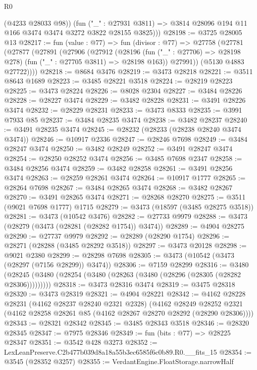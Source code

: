 \begin{lexlean}{R0}
\begin{coremodule}
          (@4233 @28033 @98))
        (fun ("_" : @27931 @3811) =>
        @3814 @28096 @194 @11 @166 @3474 @3474 @3272 @3822 @28155 @3825)))
@28198 := @3725 @28005 @13
@28217 := fun (value : @77) =>
  fun (divisor : @77) =>
  @27758
    (@27781
      (@27877
        (@27891
          (@27906
            (@27912
              (@28196 (fun ("_" : @27706) => @28198 @278) (fun ("_" : @27705 @3811) => @28198 @163))
              @27991))
          (@5130 @4883 @27722))))
@28218 := @8684 @3476
@28219 := @3473 @28218
@28221 := @3511 @8643 @1689
@28223 := @3485 @28221 @3518
@28224 := @28219 @28223
@28225 := @3473 @28224
@28226 := @8028 @2304
@28227 := @3484 @28226
@28228 := @28227 @3474
@28229 := @3482 @28228
@28231 := @3491 @28226 @3474
@28232 := @28229 @28231
@28233 := @3473 @8333
@28235 := @3991 @7933 @85
@28237 := @3484 @28235 @3474
@28238 := @3482 @28237
@28240 := @3491 @28235 @3474
@28245 := @28232 (@28233 (@28238 @28240 @3474 @3474))
@28246 := @10917 @2336
@28247 := @28246 @7698
@28249 := @3484 @28247 @3474
@28250 := @3482 @28249
@28252 := @3491 @28247 @3474
@28254 := @28250 @28252 @3474
@28256 := @3485 @7698 @2347
@28258 := @3484 @28256 @3474
@28259 := @3482 @28258
@28261 := @3491 @28256 @3474
@28263 := @28259 @28261 @3474
@28264 := @10917 @1777
@28265 := @28264 @7698
@28267 := @3484 @28265 @3474
@28268 := @3482 @28267
@28270 := @3491 @28265 @3474
@28271 := @28268 @28270
@28275 := @3511 (@9021 @7698 @1777) @1715
@28279 := @3473 (@18597 (@3485 @28275 @3518))
@28281 := @3473 (@10542 @3476)
@28282 := @27733 @9979
@28288 := @3473 (@28279 (@3473 (@28281 (@28282 @1754)) @3474))
@28289 := @4904 @28275
@28290 := @27737 @9979
@28292 := @28289 (@28290 @1754)
@28296 := @28271 (@28288 (@3485 @28292 @3518))
@28297 := @3473 @20128
@28298 := @9021 @2380
@28299 := @28298 @7698
@28305 := @3473 (@10542 (@3473 (@28297 (@7156 @28299)) @3474))
@28306 := @7159 @28299
@28316 := @3480 (@28245 (@3480 (@28254 (@3480 (@28263 (@3480 (@28296 (@28305 (@28282 @28306)))))))))
@28318 := @3473 @28316 @3474
@28319 := @3475 @28318
@28320 := @3473 @28319
@28321 := @4904 @28221
@28342 := @4162
    @28228
    @28231
    (@4162 @28237 @28240 @2321 @2328)
    (@4162
      @28249
      @28252
      @2321
      (@4162 @28258 @28261 @85 (@4162 @28267 @28270 @28292 (@28290 @28306))))
@28343 := @28321 @28342
@28345 := @3485 @28343 @3518
@28346 := @28320 @28345
@28347 := @7975 @28346
@28349 := fun (bits : @77) => @28225 @28347
@28351 := @3542 @428 @3273
@28352 := LexLeanPreserve.C2b477b039d8a18a55b3ec6585f6c0b89.R0.__fits_15
@28354 := @3545 (@28352 @3257)
@28355 := VerdantEngine.FloatStorage.narrowHalf

\end{coremodule}
\end{lexlean}
